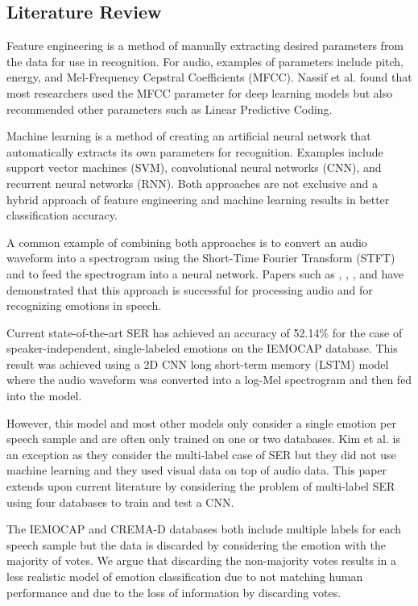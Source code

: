 \documentclass[conference]{IEEEtran}
\begin{document}
\subsection{Literature Review}

Feature engineering is a method of manually extracting desired parameters from the data for use in  recognition. For audio, examples of parameters include pitch, energy, and Mel-Frequency Cepstral Coefficients (MFCC).\cite{Rybka2013} Nassif et al. \cite{Nassif2019} found that most researchers used the MFCC parameter for deep learning models but also recommended other parameters such as Linear Predictive Coding. 

Machine learning is a method of creating an artificial neural network that automatically extracts its own parameters for recognition. Examples include support vector machines (SVM), convolutional neural networks (CNN), and recurrent neural networks (RNN). Both approaches are not exclusive and a hybrid approach of feature engineering and machine learning results in better classification accuracy.\cite{Nassif2019}

A common example of combining both approaches is to convert an audio waveform into a spectrogram using the Short-Time Fourier Transform (STFT) and to feed the spectrogram into a neural network. Papers such as \cite{Engel2019}, \cite{Chen2018}, \cite{Badshah2019}, and \cite{Zhao2019} have demonstrated that this approach is successful for processing audio and for recognizing emotions in speech.

Current state-of-the-art SER has achieved an accuracy of 52.14\% for the case of speaker-independent, single-labeled emotions on the IEMOCAP database.\cite{Zhao2019} This result was achieved using a 2D CNN long short-term memory (LSTM) model where the audio waveform was converted into a log-Mel spectrogram and then fed into the model.

However, this model and most other models only consider a single emotion per speech sample and are often only trained on one or two databases. Kim et al. \cite{Kim2018a} is an exception as they consider the multi-label case of SER but they did not use machine learning and they used visual data on top of audio data. This paper extends upon current literature by considering the problem of multi-label SER using four databases to train and test a CNN.

The IEMOCAP \cite{busso_2008} and CREMA-D \cite{cao_2014} databases both include multiple labels for each speech sample but the data is discarded by considering the emotion with the majority of votes. We argue that discarding the non-majority votes results in a less realistic model of emotion classification due to not matching human performance and due to the loss of information by discarding votes.
\end{document}
